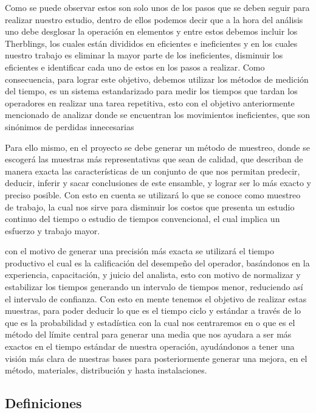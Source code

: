 Como se puede observar estos son solo unos de los pasos que se deben seguir para realizar nuestro estudio, dentro de ellos podemos decir que a la hora del análisis uno debe desglosar la operación en elementos y entre estos debemos incluir los Therblings, los cuales están divididos en eficientes e ineficientes y en los cuales nuestro trabajo es eliminar la mayor parte de los ineficientes, disminuir los eficientes e identificar cada uno de estos en los pasos a realizar. Como consecuencia, para lograr este objetivo, debemos utilizar los métodos de medición del tiempo, es un sistema estandarizado para medir los tiempos que tardan los operadores en realizar una tarea repetitiva, esto con el objetivo anteriormente mencionado de analizar donde se encuentran los movimientos ineficientes, que son sinónimos de perdidas innecesarias \cite{DanielGrifol}

Para ello mismo, en el proyecto se debe generar un método de muestreo, donde se escogerá las muestras más representativas que sean de calidad, que describan de manera exacta las características de un conjunto de que nos permitan predecir, deducir, inferir y sacar conclusiones de este ensamble, y lograr ser lo más exacto y preciso posible. Con esto en cuenta se utilizará lo que se conoce como muestreo de trabajo, la cual nos sirve para disminuir los costos que presenta un estudio continuo del tiempo o estudio de tiempos convencional, el cual implica un esfuerzo y trabajo mayor.

con el motivo de generar una precisión más exacta se utilizará el tiempo productivo el cual es la calificación del desempeño del operador, basándonos en la experiencia, capacitación, y juicio del analista, esto con motivo de normalizar y estabilizar los tiempos generando un intervalo de tiempos menor, reduciendo así el intervalo de confianza. Con esto en mente tenemos el objetivo de realizar estas muestras, para poder deducir lo que es el tiempo ciclo y estándar a través de lo que es la probabilidad y estadística con la cual nos centraremos en o que es el método del límite central para generar una media que nos ayudara a ser más exactos en el tiempo estándar de nuestra operación, ayudándonos a tener una visión más clara de nuestras bases para posteriormente generar una mejora, en el método, materiales, distribución y hasta instalaciones.

\subsection{Definiciones}

